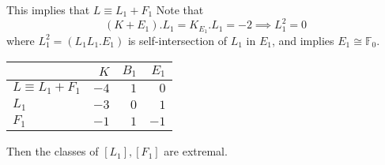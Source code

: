 \documentclass{article}
\begin{document}
This implies that $ L\equiv L_1+F_1 $ 
Note that
\[ (K+E_1).L_1=K_{E_1}.L_1=-2 \implies L_1^2=0\]
where $ L^2_1=(L_1L_1.E_1) $ is self-intersection of $ L_1 $ in $ E_1 $, and implies $ E_1\cong \mathbb{F}_0 $.
\begin{center}
	\begin{tabular}{l|rrr}
		
		& $ K $ & $ B_1 $ &$ E_1 $  \\
		\hline
		$ L\equiv L_1+F_1 $ & $ -4  $ & $ 1 $ & $ 0 $  \\
		
		$ L_1 $ & $ -3 $ & $ 0 $ &$ 1 $  \\
		
		$ F_1 $ & $ -1 $ & $ 1 $ & $ -1 $ \\
		
	\end{tabular}
\end{center}
Then the classes of $ [L_1],[F_1]$ are extremal. 
\end{document}
